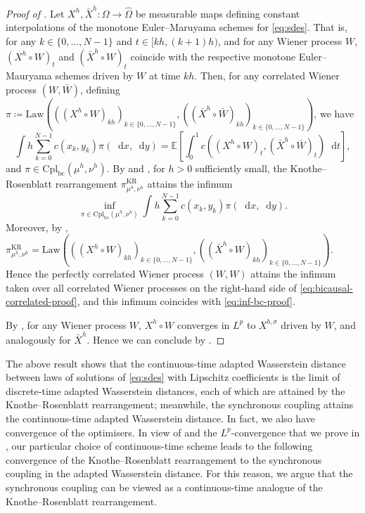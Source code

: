 \documentclass[oneside]{amsart}
\theoremstyle{definition}
\newcommand{\Law}{\mathrm{Law}}
\newcommand{\cplbc}{\mathrm{Cpl}_{\mathrm{bc}}}
\newcommand{\kr}{\mathrm{KR}}
\newcommand{\D}{\mathop{}\!\mathrm{d}}
\def\E{{\mathbb E}}
\numberwithin{equation}{section}
\begin{document}
\begin{proof}[Proof of ]
Let $X^h, \bar X^h \colon \Omega \to \hat \Omega$ be measurable maps defining constant interpolations of the monotone Euler--Maruyama schemes for \eqref{eq:sdes}. That is, for any $k \in \{0, \dotsc, N - 1\}$ and $t \in [kh, (k + 1)h)$, and for any Wiener process $W$, $(X^h \circ W)_t$ and $(\bar X^h \circ W)_t$ coincide with the respective monotone Euler--Mauryama schemes driven by $W$ at time $kh$. Then, for any correlated Wiener process $(W, \bar W)$, defining $\pi \coloneqq \Law(((X^h \circ W)_{kh})_{k \in \{0, \dotsc, N - 1\}}, ((\bar X^h \circ \bar W)_{kh})_{k \in \{0, \dotsc, N - 1\}})$, we have
\begin{equation}\label{eq:bicausal-correlated-proof}
	\int h \sum_{k = 0}^{N - 1} c(x_k, y_k) \pi (\D x, \D y) = \E\!\left[\int_0^1 c((X^h \circ W)_t, (\bar X^h \circ \bar W)_t) \D t\right],
\end{equation}
and $\pi \in \cplbc(\mu^h, \nu^h)$. By  and , for $h > 0$ sufficiently small, the Knothe--Rosenblatt rearrangement $\pi^\kr_{\mu^h, \nu^h}$ attains the infimum
\begin{equation}\label{eq:inf-bc-proof}
	\inf_{\pi\in\cplbc(\mu^h,\nu^h)}\int h \sum_{k = 0}^{N - 1} c(x_k,y_k) \pi(\D x, \D y).
\end{equation}
Moreover, by , $\pi^\kr_{\mu^h,\nu^h} = \Law(((X^h \circ W)_{kh})_{k \in \{0, \dotsc, N - 1\}}, ((\bar X^h \circ W)_{kh})_{k \in \{0, \dotsc, N - 1\}})$. Hence the perfectly correlated Wiener process $(W, W)$ attains the infimum taken over all correlated Wiener processes on the right-hand side of \eqref{eq:bicausal-correlated-proof}, and this infimum coincides with \eqref{eq:inf-bc-proof}.

By , for any Wiener process $W$, $X^h \circ W$ converges in $L^p$ to $X^{b, \sigma}$ driven by $W$, and analogously for $\bar X^h$. Hence we can conclude by .
\end{proof}

The above result shows that the continuous-time adapted Wasserstein distance between laws of solutions of \eqref{eq:sdes} with Lipschitz coefficients is the limit of discrete-time adapted Wasserstein distances, each of which are attained by the Knothe--Rosenblatt rearrangement; meanwhile, the synchronous coupling attains the continuous-time adapted Wasserstein distance. In fact, we also have convergence of the optimisers. In view of  and the $L^p$-convergence that we prove in , our particular choice of continuous-time scheme leads to the following convergence of the Knothe--Rosenblatt rearrangement to the synchronous coupling in the adapted Wasserstein distance. For this reason, we argue that the synchronous coupling can be viewed as a continuous-time analogue of the Knothe--Rosenblatt rearrangement.
\end{document}
